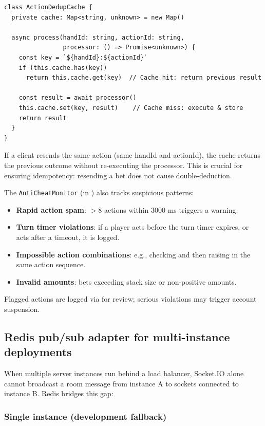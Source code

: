 \documentclass[11pt,a4paper]{article}
\begin{document}
\begin{verbatim}
class ActionDedupCache {
  private cache: Map<string, unknown> = new Map()

  async process(handId: string, actionId: string,
                processor: () => Promise<unknown>) {
    const key = `${handId}:${actionId}`
    if (this.cache.has(key))
      return this.cache.get(key)  // Cache hit: return previous result

    const result = await processor()
    this.cache.set(key, result)    // Cache miss: execute & store
    return result
  }
}
\end{verbatim}

\noindent If a client resends the same action (same handId and actionId), the cache returns the previous outcome without re-executing the processor. This is crucial for ensuring idempotency: resending a bet does not cause double-deduction.

The \texttt{AntiCheatMonitor} (in ) also tracks suspicious patterns:

\begin{itemize}
\item \textbf{Rapid action spam}: $>8$ actions within 3000 ms triggers a warning.
\item \textbf{Turn timer violations}: if a player acts before the turn timer expires, or acts after a timeout, it is logged.
\item \textbf{Impossible action combinations}: e.g., checking and then raising in the same action sequence.
\item \textbf{Invalid amounts}: bets exceeding stack size or non-positive amounts.
\end{itemize}

Flagged actions are logged via  for review; serious violations may trigger account suspension.

\subsection{Redis pub/sub adapter for multi-instance deployments}

When multiple server instances run behind a load balancer, Socket.IO alone cannot broadcast a room message from instance A to sockets connected to instance B. Redis bridges this gap:

\subsubsection{Single instance (development fallback)}
\end{document}

